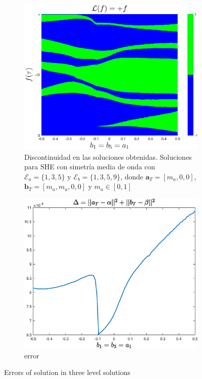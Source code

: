 \begin{enumerate}
    \begin{figure}
        \centering
        \begin{subfigure}[b]{\textwidth}
            \centering
            \includegraphics[scale=0.4]{img/alphabeta.eps}
            \caption{Discontinuidad en las soluciones obtenidas. Soluciones para SHE con simetría media de onda con $\mathcal{E}_a = \{1,3,5\}$ y  $\mathcal{E}_b = \{1,3,5,9\}$, donde $\bm{a}_T = [m_a,0,0]$, $\bm{b}_T = [m_a,m_a,0,0]$ y  $m_a \in [0,1]$}
        \end{subfigure} 
        \hfill 
        \begin{subfigure}[b]{\textwidth}
            \centering
            \includegraphics[scale=0.4]{img/alphabeta_error.eps}
            \caption{error}
        \end{subfigure}
        \caption{Errors of solution in three level solutions}
        \label{ex3LVL}
    \end{figure}


\end{enumerate}






